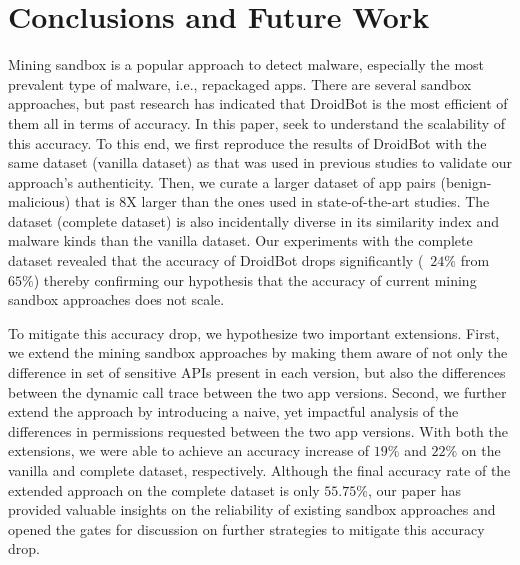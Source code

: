 \section{Conclusions and Future Work}\label{sec:conclusions}


Mining sandbox is a popular approach to detect malware, especially the most prevalent type of malware, i.e., repackaged apps. There are several sandbox approaches, but past research has indicated that DroidBot is the most efficient of them all in terms of accuracy. In this paper, seek to understand the scalability of this accuracy. To this end, we first reproduce the results of DroidBot with the same dataset (vanilla dataset) as that was used in previous studies to validate our approach's authenticity. Then, we curate a larger dataset of app pairs (benign-malicious) that is 8X larger than the ones used in state-of-the-art studies. The dataset (complete dataset) is also incidentally diverse in its similarity index and malware kinds than the vanilla dataset. Our experiments with the complete dataset revealed that the accuracy of DroidBot drops significantly (~$24\%$ from ~$65\%$) thereby confirming our hypothesis that the accuracy of current mining sandbox approaches does not scale.
      
To mitigate this accuracy drop, we hypothesize two important extensions. First, we extend the mining sandbox approaches by making them aware of not only the difference in set of sensitive APIs present in each version, but also the differences between the dynamic call trace between the two app versions. Second, we further extend the approach by introducing a naive, yet impactful analysis of the differences in permissions requested between the two app versions. With both the extensions, we were able to achieve an accuracy increase of $19\%$ and $22\%$ on the vanilla and complete dataset, respectively. Although the final accuracy rate of the extended approach on the complete dataset is only $55.75\%$, our paper has provided valuable insights on the reliability of existing sandbox approaches and opened the gates for discussion on further strategies to mitigate this accuracy drop. 



